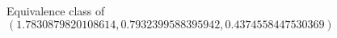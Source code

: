 \documentclass[preview]{standalone}
\begin{document}
\begin{center}
Equivalence class of $(1.7830879820108614, 0.7932399588395942, 0.4374558447530369)$
\end{center}
\end{document}
